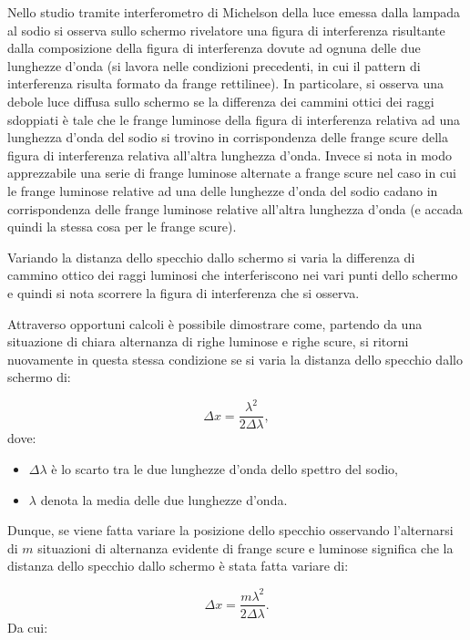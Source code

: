 \documentclass[a4paper,12pt]{article}
\begin{document}
Nello studio tramite interferometro di Michelson della luce emessa dalla lampada al sodio si osserva sullo schermo rivelatore una figura di interferenza risultante dalla composizione della figura di interferenza dovute ad ognuna delle due lunghezze d’onda (si lavora nelle condizioni precedenti, in cui il pattern di interferenza risulta formato da frange rettilinee). In particolare, si osserva una debole luce diffusa sullo schermo se la differenza dei cammini ottici dei raggi sdoppiati è tale che le frange luminose della figura di interferenza relativa ad una lunghezza d’onda del sodio si trovino in corrispondenza delle frange scure della figura di interferenza relativa all’altra lunghezza d’onda. Invece si nota in modo apprezzabile una serie di frange luminose alternate a frange scure nel caso in cui le frange luminose relative ad una delle lunghezze d’onda del sodio cadano in corrispondenza delle frange luminose relative all’altra lunghezza d’onda (e accada quindi la stessa cosa per le frange scure).

Variando la distanza dello specchio dallo schermo si varia la differenza di cammino ottico dei raggi luminosi che interferiscono nei vari punti dello schermo e quindi si nota scorrere la figura di interferenza che si osserva.

Attraverso opportuni calcoli è possibile dimostrare come, partendo da una situazione di chiara alternanza di righe luminose e righe scure, si ritorni nuovamente in questa stessa condizione se si varia la distanza dello specchio dallo schermo di:

\begin{equation}
\Delta x = \frac{\lambda^2}{2\Delta\lambda},
\end{equation}
dove:
\begin{itemize}
    \item \( \Delta\lambda \) è lo scarto tra le due lunghezze d’onda dello spettro del sodio,
    \item \( \lambda \) denota la media delle due lunghezze d’onda.
\end{itemize}

Dunque, se viene fatta variare la posizione dello specchio osservando l’alternarsi di \( m \) situazioni di alternanza evidente di frange scure e luminose significa che la distanza dello specchio dallo schermo è stata fatta variare di:

\begin{equation}
\Delta x = \frac{m\lambda^2}{2\Delta\lambda}.
\end{equation}
Da cui:
\end{document}
